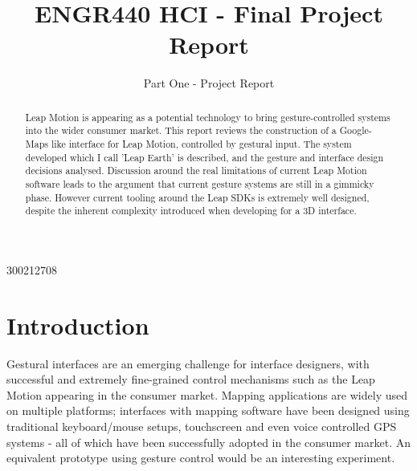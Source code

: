 \documentclass{sigplanconf}
\begin{document}
\setlength{\pdfpageheight}{\paperheight}
\setlength{\pdfpagewidth}{\paperwidth}



\title{ENGR440 HCI - Final Project Report}
\subtitle{Part One - Project Report}

           {300212708}      


\maketitle

\begin{abstract}

Leap Motion is appearing as a potential technology to bring gesture-controlled systems into the wider consumer market. This report reviews the construction of a Google-Maps like interface for Leap Motion, controlled by gestural input. The system developed which I call 'Leap Earth' is described, and the gesture and interface design decisions analysed. Discussion around the real limitations of current Leap Motion software leads to the argument that current gesture systems are still in a gimmicky phase. However current tooling around the Leap SDKs is extremely well designed, despite the inherent complexity introduced when developing for a 3D interface.

\end{abstract}

\section{Introduction}

Gestural interfaces are an emerging challenge for interface designers, with successful and extremely fine-grained control mechanisms such as the Leap Motion appearing in the consumer market. Mapping applications are widely used on multiple platforms; interfaces with mapping software have been designed using traditional keyboard/mouse setups, touchscreen and even voice controlled GPS systems - all of which have been successfully adopted in the consumer market. An equivalent prototype using gesture control would be an interesting experiment.
\end{document}
